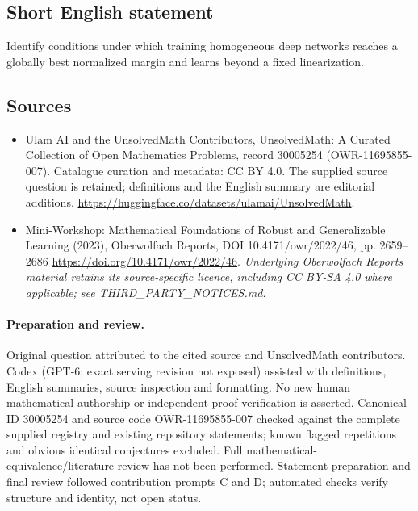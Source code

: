 \documentclass[11pt]{article}
\begin{document}
\subsection{Short English statement}
Identify conditions under which training homogeneous deep networks reaches a globally best normalized margin and learns beyond a fixed linearization.
\subsection{Sources}
\begin{itemize}
\item[\hypertarget{source:30005254:1}{S1}] Ulam AI and the UnsolvedMath Contributors, UnsolvedMath: A Curated Collection of Open Mathematics Problems, record 30005254 (OWR-11695855-007). Catalogue curation and metadata: CC BY 4.0. The supplied source question is retained; definitions and the English summary are editorial additions.
\url{https://huggingface.co/datasets/ulamai/UnsolvedMath}.
\item[\hypertarget{source:30005254:2}{S2}] Mini-Workshop: Mathematical Foundations of Robust and Generalizable Learning (2023), Oberwolfach Reports, DOI 10.4171/owr/2022/46, pp. 2659--2686
\url{https://doi.org/10.4171/owr/2022/46}.
\textit{Underlying Oberwolfach Reports material retains its source-specific licence, including CC BY-SA 4.0 where applicable; see THIRD\_PARTY\_NOTICES.md.}
\end{itemize}
\paragraph{Preparation and review.}
Original question attributed to the cited source and UnsolvedMath contributors. Codex (GPT-6; exact serving revision not exposed) assisted with definitions, English summaries, source inspection and formatting. No new human mathematical authorship or independent proof verification is asserted. Canonical ID 30005254 and source code OWR-11695855-007 checked against the complete supplied registry and existing repository statements; known flagged repetitions and obvious identical conjectures excluded. Full mathematical-equivalence/literature review has not been performed. Statement preparation and final review followed contribution prompts C and D; automated checks verify structure and identity, not open status.
\label{end:30005254}
\end{document}
